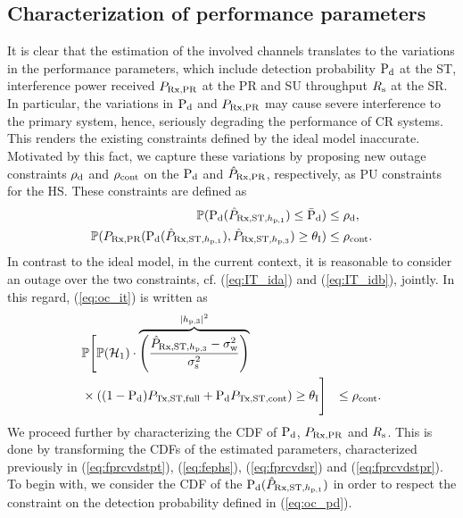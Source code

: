 \subsection*{Characterization of performance parameters}
It is clear that the estimation of the involved channels translates to the variations in the performance parameters, which include detection probability $\text{P}_{\text{d}}$ at the ST, interference power received $P_{\text{Rx,PR}}$ at the PR and SU throughput $R_{\text{s}}$ at the SR. In particular, the variations in $\text{P}_{\text{d}}$ and $P_{\text{Rx,PR}}$ may cause severe interference to the primary system, hence, seriously degrading the performance of CR systems. This renders the existing constraints defined by the ideal model inaccurate. 
Motivated by this fact, we capture these variations by proposing new outage constraints $\rho_{\text{d}}$ and $\rho_{\text{cont}}$ on the $\text{P}_{\text{d}}$ and $\hat{P}_{\text{Rx,PR}}$, respectively, as PU constraints for the HS. These constraints are defined as  
\begin{align}
\mathbb P(\text{P}_{\text{d}}(\hat{P}_{\text{Rx,ST,$h_{\text{p,1}}$}}) \le \bar{\text{P}}_{\text{d}}) &\le \rho_{\text{d}} \label{eq:oc_pd}, \\
\mathbb P(P_{\text{Rx,PR}}(\text{P}_{\text{d}}(\hat{P}_{\text{Rx,ST,$h_{\text{p,1}}$}}), \hat{P}_{\text{Rx,ST,$h_{\text{p,3}}$}}) \ge \theta_{\text{I}}) &\le \rho_{\text{cont}} \label{eq:oc_it}.
\end{align}   
In contrast to the ideal model, in the current context, it is reasonable to consider an outage over the two constraints, cf. (\ref{eq:IT_ida}) and (\ref{eq:IT_idb}), jointly. In this regard, (\ref{eq:oc_it}) is written as 
\begin{align}
& \mathbb P \Bigg[ \mathbb P(\mathcal{H}_1) \cdot \smash[b]{\overbrace{\left( \frac{\hat{P}_{\text{Rx,ST,$h_{\text{p,3}}$}} - \sigma^2_{\text{w}}}{\sigma^2_{\text{s}}} \right)}^{|h_{\text{p,3}}|^2}} \nonumber \\ & \times ((1 - \text{P}_{\text{d}}) P_{\text{Tx,ST,full}} + \text{P}_{\text{d}} P_{\text{Tx,ST,cont}}) \ge \theta_{\text{I}} \Bigg] &\le \rho_{\text{cont}} \label{eq:oc_it_def}. 
\end{align}
We proceed further by characterizing the CDF of $\text{P}_{\text{d}}$, $P_{\text{Rx,PR}}$ and $R_{\text{s}}$. This is done by transforming the CDFs of the estimated parameters, characterized previously in (\ref{eq:fprcvdstpt}), (\ref{eq:fephs}), (\ref{eq:fprcvdsr}) and (\ref{eq:fprcvdstpr}). To begin with, we consider the CDF of the $\text{P}_{\text{d}}(\hat{P}_{\text{Rx,ST,$h_{\text{p,1}}$}})$ in order to respect the constraint on the detection probability defined in (\ref{eq:oc_pd}). 
